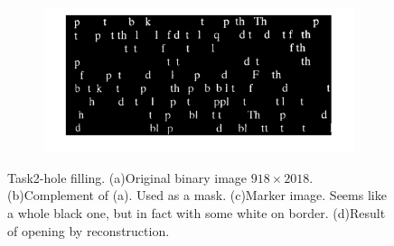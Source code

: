 \begin{figure}[h!]
	\begin{subfigure}[b]{0.45\linewidth}
    	\includegraphics[width=\linewidth]{myfigure/p8/fig0929(d).png}
    	\caption{}
    	\label{fig:0931d}
  	\end{subfigure}
  	\caption{Task2-hole filling. (a)Original binary image $918 \times 2018$. (b)Complement of (a). Used as a mask. (c)Marker image. Seems like a whole black one, but in fact with some white on border. (d)Result of opening by reconstruction.}
  	\label{fig:0931}
\end{figure}

